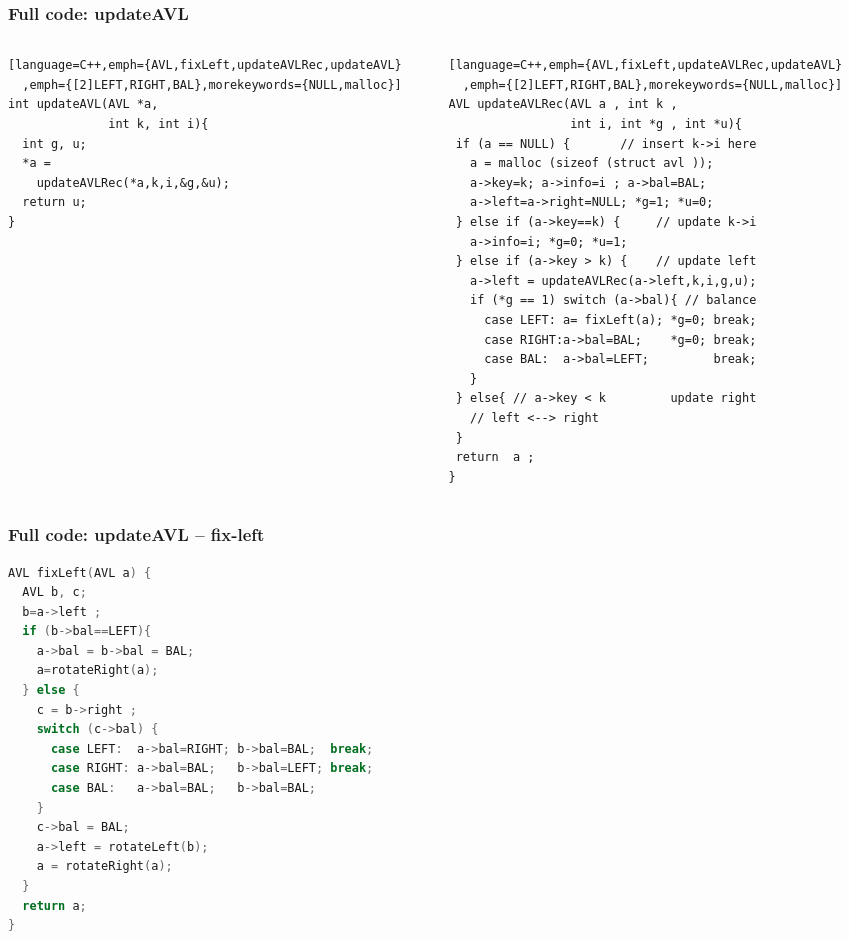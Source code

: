 \documentclass[aspectratio=169]{beamer}
\begin{document}
\begin{frame}[fragile]\frametitle{Full code: updateAVL}
    
\begin{columns}
\begin{column}{.42\textwidth}
%
\begin{lstlisting}[language=C++,emph={AVL,fixLeft,updateAVLRec,updateAVL}
  ,emph={[2]LEFT,RIGHT,BAL},morekeywords={NULL,malloc}]
int updateAVL(AVL *a,
              int k, int i){
  int g, u;
  *a =
    updateAVLRec(*a,k,i,&g,&u);
  return u;
}


\end{lstlisting}
%
\end{column}
\begin{column}{.58\textwidth}
\begin{lstlisting}[language=C++,emph={AVL,fixLeft,updateAVLRec,updateAVL}
  ,emph={[2]LEFT,RIGHT,BAL},morekeywords={NULL,malloc}]
AVL updateAVLRec(AVL a , int k ,
                 int i, int *g , int *u){
 if (a == NULL) {       // insert k->i here
   a = malloc (sizeof (struct avl ));
   a->key=k; a->info=i ; a->bal=BAL;
   a->left=a->right=NULL; *g=1; *u=0;
 } else if (a->key==k) {     // update k->i
   a->info=i; *g=0; *u=1;
 } else if (a->key > k) {    // update left
   a->left = updateAVLRec(a->left,k,i,g,u);
   if (*g == 1) switch (a->bal){ // balance
     case LEFT: a= fixLeft(a); *g=0; break;
     case RIGHT:a->bal=BAL;    *g=0; break;
     case BAL:  a->bal=LEFT;         break;
   }
 } else{ // a->key < k         update right
   // left <--> right
 }
 return  a ;
}
\end{lstlisting}
\end{column}
\end{columns}
\end{frame}

\begin{frame}[fragile]\frametitle{Full code: updateAVL -- fix-left}
    
\begin{lstlisting}[language=C++,emph={AVL,rotateLeft,rotateRight,fixLeft},emph={[2]LEFT,RIGHT,BAL}]
AVL fixLeft(AVL a) {
  AVL b, c;
  b=a->left ;
  if (b->bal==LEFT){
    a->bal = b->bal = BAL;
    a=rotateRight(a);
  } else {
    c = b->right ;
    switch (c->bal) {
      case LEFT:  a->bal=RIGHT; b->bal=BAL;  break;
      case RIGHT: a->bal=BAL;   b->bal=LEFT; break;
      case BAL:   a->bal=BAL;   b->bal=BAL;
    }
    c->bal = BAL;
    a->left = rotateLeft(b);
    a = rotateRight(a);
  }
  return a;
}
\end{lstlisting}

\end{frame}
\end{document}
